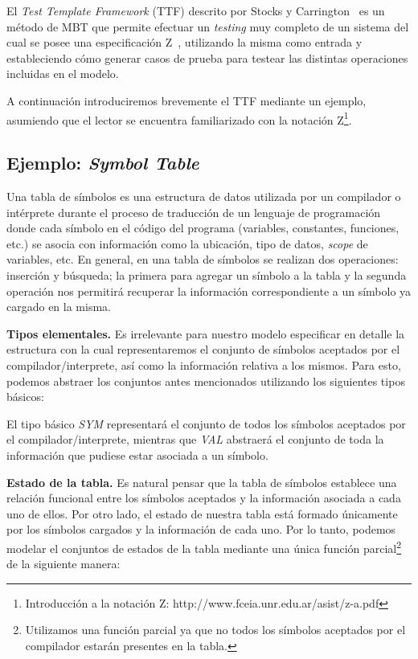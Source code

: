 El \textit{Test Template Framework} (TTF) descrito por Stocks y Carrington~\cite{stocks} es un método de MBT que permite efectuar un \textit{testing} muy completo de un sistema del cual se posee una especificación Z~\cite{spivey}, utilizando la misma como entrada y estableciendo cómo generar casos de prueba para testear las distintas operaciones incluidas en el modelo.

A continuación introduciremos brevemente el TTF mediante un ejemplo, asumiendo que el lector se encuentra familiarizado con la notación Z\footnote{Introducción a la notación Z: http://www.fceia.unr.edu.ar/asist/z-a.pdf}.

\subsection{Ejemplo: \emph{Symbol Table}}
\label{sec:ej-symbolTable}

Una tabla de símbolos es una estructura de datos utilizada por un compilador o intérprete durante el proceso de traducción de un lenguaje de programación donde cada símbolo en el código del programa (variables, constantes, funciones, etc.) se asocia con información como la ubicación, tipo de datos, \textit{scope} de variables, etc. 
En general, en una tabla de símbolos se realizan dos operaciones: inserción y búsqueda; la primera para agregar un símbolo a la tabla y la segunda operación nos permitirá recuperar la información correspondiente a un símbolo ya cargado en la misma.


\bigskip
\noindent
\textbf{Tipos elementales.} Es irrelevante para nuestro modelo especificar en detalle la estructura con la cual representaremos el conjunto de símbolos aceptados por el compilador/interprete, así como la información relativa a los mismos. Para esto, podemos abstraer los conjuntos antes mencionados utilizando los siguientes tipos básicos: 

\begin{zed}
\end{zed}

El tipo básico \emph{SYM} representará el conjunto de todos los símbolos aceptados por el compilador/interprete, mientras que \emph{VAL} abstraerá el conjunto de toda la información que pudiese estar asociada a un símbolo.
 
\bigskip
\noindent
\textbf{Estado de la tabla.} Es natural pensar que la tabla de símbolos establece una relación funcional entre los símbolos aceptados y la información asociada a cada uno de ellos. Por otro lado, el estado de nuestra tabla está formado únicamente por los símbolos cargados y la información de cada uno. Por lo tanto, podemos modelar el conjuntos de estados de la tabla mediante una única función parcial\footnote{Utilizamos una función parcial ya que no todos los símbolos aceptados por el compilador estarán presentes en la tabla.} de la siguiente manera:

